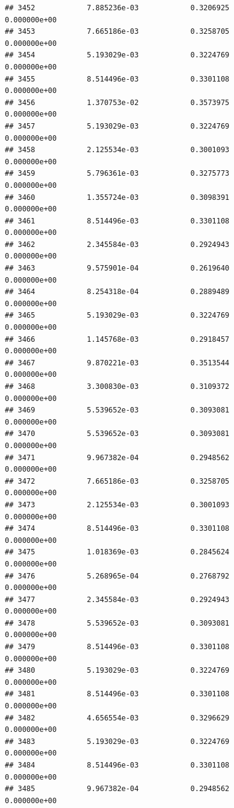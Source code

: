 \documentclass[
]{article}
\begin{document}
\begin{verbatim}
## 3452            7.885236e-03            0.3206925            0.000000e+00
## 3453            7.665186e-03            0.3258705            0.000000e+00
## 3454            5.193029e-03            0.3224769            0.000000e+00
## 3455            8.514496e-03            0.3301108            0.000000e+00
## 3456            1.370753e-02            0.3573975            0.000000e+00
## 3457            5.193029e-03            0.3224769            0.000000e+00
## 3458            2.125534e-03            0.3001093            0.000000e+00
## 3459            5.796361e-03            0.3275773            0.000000e+00
## 3460            1.355724e-03            0.3098391            0.000000e+00
## 3461            8.514496e-03            0.3301108            0.000000e+00
## 3462            2.345584e-03            0.2924943            0.000000e+00
## 3463            9.575901e-04            0.2619640            0.000000e+00
## 3464            8.254318e-04            0.2889489            0.000000e+00
## 3465            5.193029e-03            0.3224769            0.000000e+00
## 3466            1.145768e-03            0.2918457            0.000000e+00
## 3467            9.870221e-03            0.3513544            0.000000e+00
## 3468            3.300830e-03            0.3109372            0.000000e+00
## 3469            5.539652e-03            0.3093081            0.000000e+00
## 3470            5.539652e-03            0.3093081            0.000000e+00
## 3471            9.967382e-04            0.2948562            0.000000e+00
## 3472            7.665186e-03            0.3258705            0.000000e+00
## 3473            2.125534e-03            0.3001093            0.000000e+00
## 3474            8.514496e-03            0.3301108            0.000000e+00
## 3475            1.018369e-03            0.2845624            0.000000e+00
## 3476            5.268965e-04            0.2768792            0.000000e+00
## 3477            2.345584e-03            0.2924943            0.000000e+00
## 3478            5.539652e-03            0.3093081            0.000000e+00
## 3479            8.514496e-03            0.3301108            0.000000e+00
## 3480            5.193029e-03            0.3224769            0.000000e+00
## 3481            8.514496e-03            0.3301108            0.000000e+00
## 3482            4.656554e-03            0.3296629            0.000000e+00
## 3483            5.193029e-03            0.3224769            0.000000e+00
## 3484            8.514496e-03            0.3301108            0.000000e+00
## 3485            9.967382e-04            0.2948562            0.000000e+00

\end{verbatim}
\end{document}
